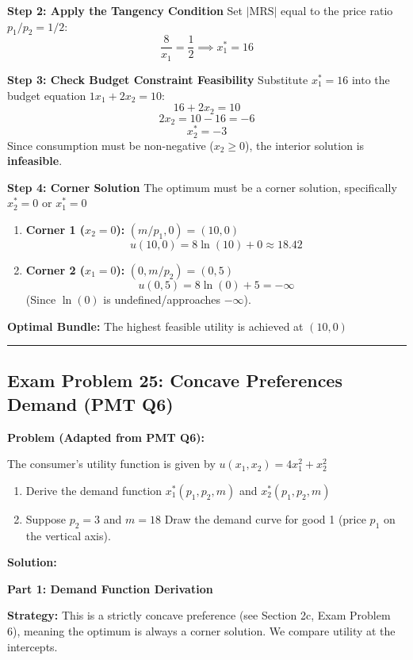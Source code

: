 \documentclass{article}
\begin{document}
\textbf{Step 2: Apply the Tangency Condition}
Set $|\text{MRS}|$ equal to the price ratio $p_1/p_2 = 1/2$:
\[ \frac{8}{x_1} = \frac{1}{2} \implies x_1^* = 16 \]

\textbf{Step 3: Check Budget Constraint Feasibility}
Substitute $x_1^*=16$ into the budget equation $1x_1 + 2x_2 = 10$:
\[ 16 + 2x_2 = 10 \]
\[ 2x_2 = 10 - 16 = -6 \]
\[ x_2^* = -3 \]
Since consumption must be non-negative ($x_2 \geq 0$), the interior solution is \textbf{infeasible}.

\textbf{Step 4: Corner Solution}
The optimum must be a corner solution, specifically $x_2^*=0$ or $x_1^* =0$

\begin{enumerate}
\item \textbf{Corner 1 ($x_2=0$):} $(m/p_1, 0) = (10, 0)$
\[ u(10, 0) = 8 \ln(10) + 0 \approx 18.42 \]
\item \textbf{Corner 2 ($x_1=0$):} $(0, m/p_2) = (0, 5)$
\[ u(0, 5) = 8 \ln(0) + 5 = -\infty \]
(Since $\ln(0)$ is undefined/approaches $-\infty$).
\end{enumerate}

\textbf{Optimal Bundle:} The highest feasible utility is achieved at $(10, 0)$

\vspace{1em}\hrule\vspace{1em}

\subsection*{Exam Problem 25: Concave Preferences Demand (PMT Q6)}

\textbf{Problem (Adapted from PMT Q6):}

The consumer's utility function is given by $u(x_1, x_2) = 4x_1^2 + x_2^2$
\begin{enumerate}
\item Derive the demand function $x_1^*(p_1, p_2, m)$ and $x_2^*(p_1, p_2, m)$
\item Suppose $p_2 = 3$ and $m = 18$ Draw the demand curve for good 1 (price $p_1$ on the vertical axis).
\end{enumerate}

\textbf{Solution:}

\textbf{Part 1: Demand Function Derivation}

\textbf{Strategy:} This is a strictly concave preference (see Section 2c, Exam Problem 6), meaning the optimum is always a corner solution. We compare utility at the intercepts.
\end{document}
